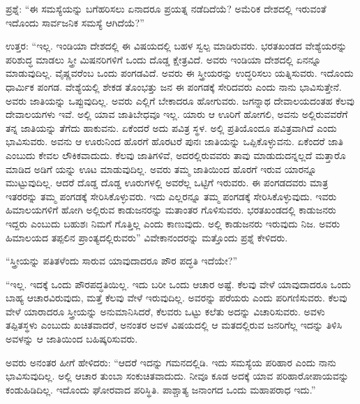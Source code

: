 ಪ್ರಶ್ನೆ: “ಈ ಸಮಸ್ಯೆಯನ್ನು ಬಗೆಹರಿಸಲು ಏನಾದರೂ ಪ್ರಯತ್ನ ನಡೆದಿದೆಯೆ? ಅಮೆರಿಕ ದೇಶದಲ್ಲಿ ಇರುವಂತೆ ಇದೊಂದು ಸಾರ್ವಜನಿಕ ಸಮಸ್ಯೆ ಆಗಿದೆಯೆ?”

ಉತ್ತರ: “ಇಲ್ಲ. ಇಂಡಿಯಾ ದೇಶದಲ್ಲಿ ಈ ವಿಷಯದಲ್ಲಿ ಬಹಳ ಸ್ವಲ್ಪ ಮಾಡಿರುವರು. ಭರತಖಂಡದ ವೇಶ್ಯೆಯರನ್ನು ಪರಿಶುದ್ಧ ಮಾಡಲು ಸ್ತ್ರೀ ಮಿಷನರಿಗಳಿಗೆ ಒಂದು ದೊಡ್ಡ ಕ್ಷೇತ್ರವಿದೆ. ಅವರು ಇಂಡಿಯಾ ದೇಶದಲ್ಲಿ ಏನನ್ನೂ ಮಾಡುವುದಿಲ್ಲ. ವೈಷ್ಣವರೆಂಬ ಒಂದು ಪಂಗಡವಿದೆ. ಅವರು ಈ ಸ್ತ್ರೀಯರನ್ನು ಉದ್ಧರಿಸಲು ಯತ್ನಿಸುವರು. ಇದೊಂದು ಧಾರ್ಮಿಕ ಪಂಗಡ. ವೇಶ್ಯೆಯಲ್ಲಿ ಶೇಕಡ ತೊಂಭತ್ತು ಜನ ಈ ಪಂಗಡಕ್ಕೆ ಸೇರಿದವರು ಎಂದು ನಾನು ಭಾವಿಸುತ್ತೇನೆ. ಅವರು ಜಾತಿಯನ್ನು ಒಪ್ಪುವುದಿಲ್ಲ. ಅವರು ಎಲ್ಲಿಗೆ ಬೇಕಾದರೂ ಹೋಗುವರು. ಜಗನ್ನಾಥ ದೇವಾಲಯದಂತಹ ಕೆಲವು ದೇವಾಲಯಗಳು ಇವೆ. ಅಲ್ಲಿ ಯಾವ ಜಾತಿಬೇಧವೂ ಇಲ್ಲ. ಯಾರು ಆ ಊರಿಗೆ ಹೋಗಲಿ, ಅವನು ಅಲ್ಲಿರುವವರೆಗೆ ತನ್ನ ಜಾತಿಯನ್ನು ತೆಗೆದು ಹಾಕುವನು. ಏಕೆಂದರೆ ಅದು ಪವಿತ್ರ ಸ್ಥಳ. ಅಲ್ಲಿ ಪ್ರತಿಯೊಂದೂ ಪವಿತ್ರವಾಗಿದೆ ಎಂದು ಭಾವಿಸುವರು. ಅವನು ಆ ಊರುನಿಂದ ಹೊರಗೆ ಹೊರಟರೆ ಪುನಃ ಜಾತಿಯನ್ನು ಒಪ್ಪಿಕೊಳ್ಳುವನು. ಏಕೆಂದರೆ ಜಾತಿ ಎಂಬುದು ಕೇವಲ ಲೌಕಿಕವಾದುದು. ಕೆಲವು ಜಾತಿಗಳಿವೆ, ಅದರಲ್ಲಿರುವವರು ತಾವು ಮಾಡುದುದನ್ನಲ್ಲದೆ ಮತ್ತಾರೊ ಮಾಡಿದ ಅಡಿಗೆ ಯನ್ನು ಊಟ ಮಾಡುವುದಿಲ್ಲ. ಅವರು ತಮ್ಮ ಜಾತಿಯಿಂದ ಹೊರಗೆ ಇರುವ ಯಾರನ್ನೂ ಮುಟ್ಟುವುದಿಲ್ಲ. ಆದರೆ ದೊಡ್ಡ ದೊಡ್ಡ ಊರುಗಳಲ್ಲಿ ಅವರೆಲ್ಲ ಒಟ್ಟಿಗೆ ಇರುವರು. ಈ ಪಂಗಡದವರು ಮಾತ್ರ ಇತರರನ್ನು ತಮ್ಮ ಪಂಗಡಕ್ಕೆ ಸೇರಿಸಿಕೊಳ್ಳುವರು. ಇದು ಎಲ್ಲರನ್ನೂ ತಮ್ಮ ಪಂಗಡಕ್ಕೆ ಸೇರಿಸಿಕೊಳ್ಳುವುದು. ಇವರು ಹಿಮಾಲಯಗಳಿಗೆ ಹೋಗಿ ಅಲ್ಲಿರುವ ಕಾಡುಜನರನ್ನು ಮತಾಂತರ ಗೊಳಿಸುವರು. ಭರತಖಂಡದಲ್ಲಿ ಕಾಡುಜನರು ಇದ್ದರು ಎಂಬುದು ಬಹುಶಃ ನಿಮಗೆ ಗೊತ್ತಿಲ್ಲ ಎಂದು ಕಾಣುವುದು. ಅಲ್ಲಿ ಕಾಡುಜನರು ಇರುವುದು ನಿಜ. ಅವರು ಹಿಮಾಲಯದ ತಪ್ಪಲಿನ ಪ್ರಾಂತ್ಯದಲ್ಲಿರುವರು” ವಿವೇಕಾನಂದರನ್ನು ಮತ್ತೊಂದು ಪ್ರಶ್ನೆ ಕೇಳಿದರು.

“ಸ್ತ್ರೀಯನ್ನು ಪತಿತಳೆಂದು ಸಾರುವ ಯಾವುದಾದರೂ ಪೌರ ಪದ್ಧತಿ ಇದೆಯೇ?”

“ಇಲ್ಲ. ಇದಕ್ಕೆ ಒಂದು ಪೌರಪದ್ಧತಿಯಿಲ್ಲ. ಇದು ಬರೀ ಒಂದು ಆಚಾರ ಅಷ್ಟೆ. ಕೆಲವು ವೇಳೆ ಯಾವುದಾದರೂ ಒಂದು ಬಾಹ್ಯ ಆಚಾರವಿರುವುದು, ಮತ್ತೆ ಕೆಲವು ವೇಳೆ ಇರುವುದಿಲ್ಲ. ಅವರನ್ನು ಪರೆಯರು ಎಂದು ಪರಿಗಣಿಸುವರು. ಕೆಲವು ವೇಳೆ ಯಾರಾದರೂ ಸ್ತ್ರೀಯನ್ನು ಅನುಮಾನಿಸಿದರೆ, ಕೆಲವರು ಒಟ್ಟು ಕಲೆತು ಅದನ್ನು ವಿಚಾರಿಸುವರು. ಅವಳು ತಪ್ಪಿತಸ್ಥಳು ಎಂಬುದು ಖಚಿತವಾದರೆ, ಅನಂತರ ಅವಳ ವಿಷಯದಲ್ಲಿ ಆ ಮತದಲ್ಲಿರುವ ಜನರಿಗೆಲ್ಲ ಇದನ್ನು ತಿಳಿಸಿ ಅವಳನ್ನು ಆ ಜಾತಿಯಿಂದ ಬಹಿಷ್ಕರಿಸುವರು.

ಅವರು ಅನಂತರ ಹೀಗೆ ಹೇಳಿದರು: “ಆದರೆ ಇದನ್ನು ಗಮನದಲ್ಲಿಡಿ. ಇದು ಸಮಸ್ಯೆಯ ಪರಿಹಾರ ಎಂದು ನಾನು ಭಾವಿಸುವುದಿಲ್ಲ. ಅಲ್ಲಿ ಆಚಾರ ತುಂಬಾ ಸಂಕುಚಿತವಾದುದು. ನೀವೂ ಕೂಡ ಅದಕ್ಕೆ ಯಾವ ಪರಿಹಾರೋಪಾಯವನ್ನು ಕಂಡುಹಿಡಿದಿಲ್ಲ. ಇದೊಂದು ಘೋರವಾದ ಪರಿಸ್ಥಿತಿ. ಪಾಶ್ಚಾತ್ಯ ಜನಾಂಗದ ಒಂದು ಮಹಾಪರಾಧ ಇದು.”

